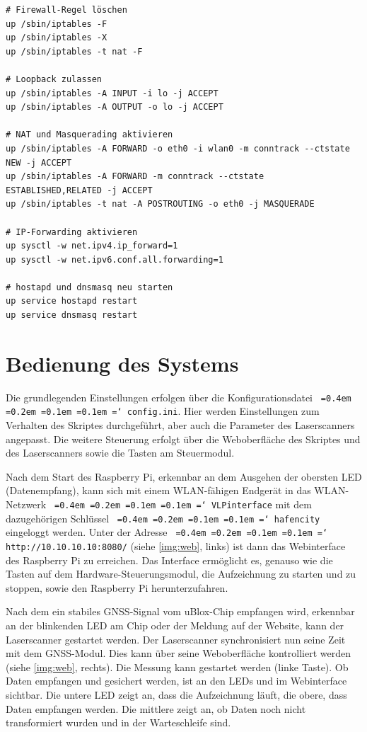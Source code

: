 \documentclass[a4paper,12pt,bibliography=totoc, listof=totoc,titlepage,pointlessnumbers]{scrreprt}
\newcommand*\justify{%
  \fontdimen2\font=0.4em%
  \fontdimen3\font=0.2em%
  \fontdimen4\font=0.1em%
  \fontdimen7\font=0.1em%
  \hyphenchar\font=`\-%
}
\newcommand{\code}[1]{\texttt{\justify{#1}}}
\begin{document}

\begin{lstlisting}[caption={Erweiterung der \code{/etc/network/interfaces} zur Nutzung als Router}, label={router}]
# Firewall-Regel löschen
up /sbin/iptables -F
up /sbin/iptables -X
up /sbin/iptables -t nat -F

# Loopback zulassen
up /sbin/iptables -A INPUT -i lo -j ACCEPT
up /sbin/iptables -A OUTPUT -o lo -j ACCEPT

# NAT und Masquerading aktivieren
up /sbin/iptables -A FORWARD -o eth0 -i wlan0 -m conntrack --ctstate NEW -j ACCEPT
up /sbin/iptables -A FORWARD -m conntrack --ctstate ESTABLISHED,RELATED -j ACCEPT
up /sbin/iptables -t nat -A POSTROUTING -o eth0 -j MASQUERADE

# IP-Forwarding aktivieren
up sysctl -w net.ipv4.ip_forward=1
up sysctl -w net.ipv6.conf.all.forwarding=1

# hostapd und dnsmasq neu starten
up service hostapd restart
up service dnsmasq restart
\end{lstlisting}

\section{Bedienung des Systems}
Die grundlegenden Einstellungen erfolgen über die Konfigurationsdatei \code{config.ini}. Hier werden Einstellungen zum Verhalten des Skriptes durchgeführt, aber auch die Parameter des Laser\-scan\-ners angepasst. Die weitere Steuerung erfolgt über die Weboberfläche des Skriptes und des Laser\-scan\-ners sowie die Tasten am Steuermodul.

Nach dem Start des Raspberry Pi, erkennbar an dem Ausgehen der obersten LED (Datenempfang), kann sich mit einem WLAN-fähigen Endgerät in das WLAN-Netzwerk \code{VLPinterface} mit dem dazugehörigen Schlüssel \code{hafencity} eingeloggt werden. Unter der Adresse \code{http://10.10.10.10:8080/} (siehe \autoref{img:web}, links) ist dann das Webinterface des Raspberry Pi zu erreichen. Das Interface ermöglicht es, genauso wie die Tasten auf dem Hardware-Steuerungsmodul, die Aufzeichnung zu starten und zu stoppen, sowie den Raspberry Pi herunterzufahren.

Nach dem ein stabiles GNSS-Signal vom uBlox-Chip empfangen wird, erkennbar an der blinkenden LED am Chip oder der Meldung auf der Website, kann der Laserscanner gestartet werden. Der Laserscanner synchronisiert nun seine Zeit mit dem GNSS-Modul. Dies kann über seine Weboberfläche kontrolliert werden (siehe \autoref{img:web}, rechts). Die Messung kann gestartet werden (linke Taste). Ob Daten empfangen und gesichert werden, ist an den LEDs und im Webinterface sichtbar. Die untere LED zeigt an, dass die Aufzeichnung läuft, die obere, dass Daten empfangen werden. Die mittlere zeigt an, ob Daten noch nicht transformiert wurden und in der Warteschleife sind.
\end{document}
